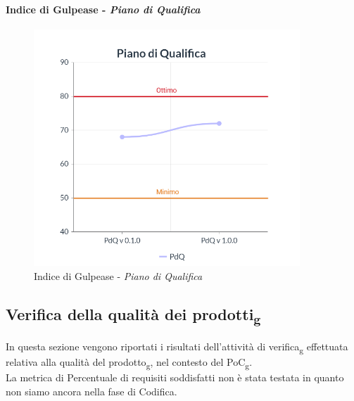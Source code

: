 \paragraph{Indice di Gulpease - \textit{Piano di Qualifica}}
\begin{center}
\begin{figure}[H]
  \centering
  \renewcommand{\thefigure}{11}
  \includegraphics[width=10cm]{./res/images/PdQGraph.png}
  \caption{Indice di Gulpease - \textit{Piano di Qualifica}}
  \label{fig:Indice di Gulpease - Piano di Qualifica}
\end{figure}
\end{center}

\subsection{Verifica della qualità dei prodotti\textsubscript{g}}
In questa sezione vengono riportati i risultati dell'attività di verifica\textsubscript{g} effettuata relativa alla qualità del prodotto\textsubscript{g}, nel contesto del PoC\textsubscript{g}.\\
La metrica di Percentuale di requisiti soddisfatti non è stata testata in quanto non siamo ancora nella fase di Codifica.

